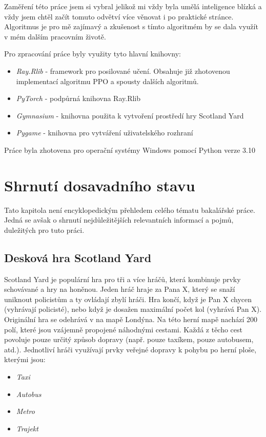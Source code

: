 Zaměření této práce jsem si vybral jelikož mi vždy byla umělá inteligence blízká a vždy jsem chtěl začít tomuto odvětví více věnovat i po praktické stránce.
Algoritmus je pro mě zajímavý a zkušenost s tímto algoritmém by se dala využít v mém dalším pracovním životě.

Pro zpracování práce byly využity tyto hlavní knihovny:
\begin{itemize}
  \item \emph{Ray.Rlib} - framework pro posilované učení. Obsahuje již zhotovenou implementací algoritmu PPO a spousty dalších algoritmů. 
  \item \emph{PyTorch} - podpůrná knihovna Ray.Rlib
  \item \emph{Gymnasium} - knihovna použita k vytvoření prostředí hry Scotland Yard
  \item \emph{Pygame} - knihovna pro vytváření uživatelského rozhraní
\end{itemize}

Práce byla zhotovena pro operační systémy Windows pomocí Python verze 3.10

\chapter{Shrnutí dosavadního stavu}
\label{ch:dosavadni_stav}
Tato kapitola není encyklopedickým přehledem celého tématu bakalářské práce.
Jedná se avšak o shrnutí nejdůležitějších relevantních informací a pojmů, duležitých pro tuto práci.

\section{Desková hra Scotland Yard}
\label{sec:deskova-hra-scotland-yard}

Scotland Yard je populární hra pro tři a více hráčů, která kombinuje prvky schovávané a hry na honěnou.
Jeden hráč hraje za Pana X, který se snaží uniknout policistům a ty ovládají zbylí hráči.
Hra končí, když je Pan X chycen (vyhrávají policisté), nebo když je dosažen maximální počet kol (vyhrává Pan X).
Originální hra se odehrává v na mapě Londýna.
Na této herní mapě nachází 200 polí, které jsou vzájemně propojené náhodnými cestami.
Každá z těcho cest povoluje pouze určitý způsob dopravy (např. pouze taxíkem, pouze autobusem, atd.).
Jednotliví hráči využívají prvky veřejné dopravy k pohybu po herní ploše, kterými jsou:
\begin{itemize}
  \item \emph{Taxi}
  \item \emph{Autobus}
  \item \emph{Metro}
  \item \emph{Trajekt}
\end{itemize}


